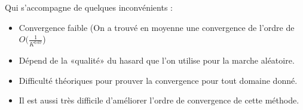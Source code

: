 \documentclass{beamer}
\begin{document}
\begin{frame}
    Qui s'accompagne de quelques inconvénients :
    \pause
    \begin{itemize}
        \item Convergence \alert{faible} (On a trouvé en moyenne une convergence de l'ordre de $O(\frac{1}{K^{0.67}}$)
        \pause
        \item Dépend de la «qualité» du hasard que l'on utilise pour la marche aléatoire.
        \pause
        \item Difficulté théoriques pour prouver la convergence pour tout domaine donné.
        \pause
        \item Il est aussi très difficile d'améliorer l'ordre de convergence de cette méthode.
    \end{itemize}
\end{frame}
\end{document}
